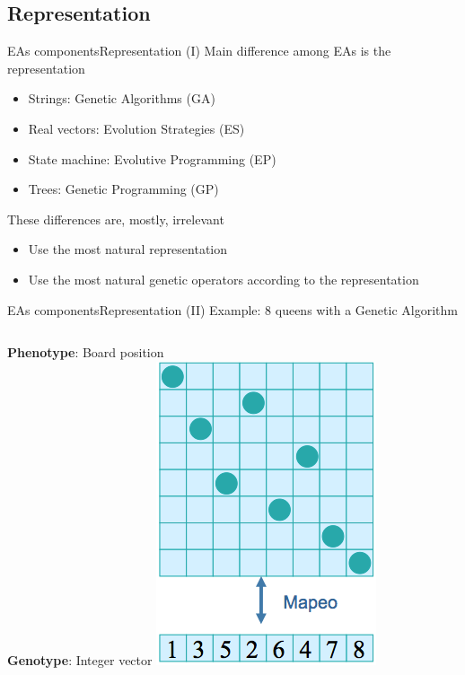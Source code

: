 \documentclass[10pt,compress]{beamer} %
\begin{document}
\subsection{Representation}
\begin{frame}{EAs components}{Representation (I)} 
	Main difference among EAs is the representation
	\begin{itemize}
		\item Strings: \alert{Genetic Algorithms (GA)}
		\item Real vectors: \alert{Evolution Strategies (ES)}
		\item State machine: \alert{Evolutive Programming (EP)}
		\item Trees: \alert{Genetic Programming (GP)}
	\end{itemize}
	These differences are, mostly, irrelevant
	\begin{itemize}
		\item Use the most natural representation
		\item Use the most natural genetic operators according to the representation
	\end{itemize}
\end{frame}

\begin{frame}{EAs components}{Representation (II)} 
	Example: 8 queens with a Genetic Algorithm
	\bigskip
    \begin{columns}
	   \textbf{Phenotype}: Board position\\
	   \textbf{Genotype}: Integer vector
		\includegraphics[width=0.7\linewidth]{figs/8queen.png}
	\end{columns}
\end{frame}
\end{document}
